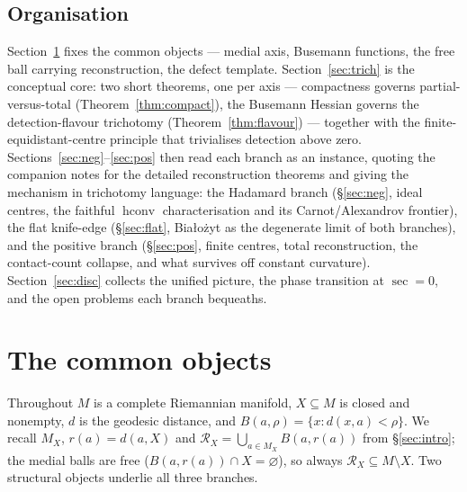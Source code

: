 \documentclass[11pt]{article}
\theoremstyle{remark}
\newcommand{\X}{X}
\newcommand{\Mx}{M_{\X}}
\newcommand{\Rx}{\mathcal{R}_{\X}}
\newcommand{\hconv}{\operatorname{hconv}}
\newcommand{\sect}{\operatorname{sec}}
\begin{document}
\subsection*{Organisation}

Section~\ref{sec:setup} fixes the common objects --- medial axis,
Busemann functions, the free ball carrying reconstruction, the defect
template. Section~\ref{sec:trich} is the conceptual core: two short
theorems, one per axis --- compactness governs partial-versus-total
(Theorem~\ref{thm:compact}), the Busemann Hessian governs the
detection-flavour trichotomy (Theorem~\ref{thm:flavour}) --- together with
the finite-equidistant-centre principle that trivialises detection above
zero. Sections~\ref{sec:neg}--\ref{sec:pos} then read each
branch as an instance, quoting the companion notes for the detailed
reconstruction theorems and giving the mechanism in trichotomy language:
the Hadamard branch (\S\ref{sec:neg}, ideal centres, the faithful $\hconv$
characterisation and its Carnot/Alexandrov frontier), the flat knife-edge
(\S\ref{sec:flat}, Bia\l{}o\.zyt as the degenerate limit of both branches),
and the positive branch (\S\ref{sec:pos}, finite centres, total
reconstruction, the contact-count collapse, and what survives off constant
curvature). Section~\ref{sec:disc} collects the unified picture, the phase
transition at $\sect=0$, and the open problems each branch bequeaths.

\section{The common objects}\label{sec:setup}

Throughout $M$ is a complete Riemannian manifold, $\X\subseteq M$ is
closed and nonempty, $d$ is the geodesic distance, and
$B(a,\rho)=\{x:d(x,a)<\rho\}$. We recall $\Mx$, $r(a)=d(a,\X)$ and
$\Rx=\bigcup_{a\in\Mx}B(a,r(a))$ from \S\ref{sec:intro}; the medial balls
are free ($B(a,r(a))\cap\X=\varnothing$), so always
$\Rx\subseteq M\setminus\X$. Two structural objects underlie all three
branches.
\end{document}
